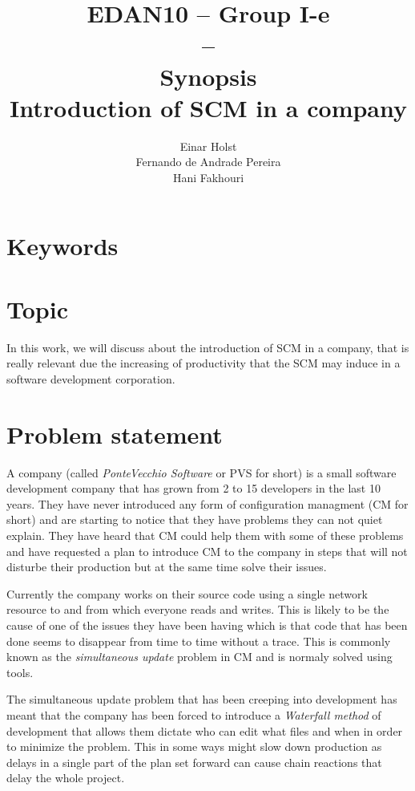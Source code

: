\documentclass[a4paper]{article}
\title{EDAN10 -- Group I-e\\--\\ Synopsis \\
Introduction of SCM in a company 
}
\author{Einar Holst \\
Fernando de Andrade Pereira \\
Hani Fakhouri
}
\begin{document}
\maketitle
\thispagestyle{empty}
\clearpage

\tableofcontents
\thispagestyle{empty}
\clearpage

\setcounter{page}{1}

\section{Keywords}


\section{Topic}
In this work, we will discuss about the introduction of SCM in a company, that is really relevant due the increasing of productivity that the SCM may induce in a  software development corporation.

\section{Problem statement}
A company (called \emph{PonteVecchio Software} or PVS for short) is a small software development company that has grown from 2 to 15 developers in the last 10 years. They have never introduced any form of configuration managment (CM for short) and are starting to notice that they have problems they can not quiet explain. They have heard that CM could help them with some of these problems and have requested a plan to introduce CM to the company in steps that will not disturbe their production but at the same time solve their issues.

Currently the company works on their source code using a single network resource to and from which everyone reads and writes. This is likely to be the cause of one of the issues they have been having which is that code that has been done seems to disappear from time to time without a trace. This is commonly known as the \emph{simultaneous update} problem in CM and is normaly solved using tools.

The simultaneous update problem that has been creeping into development has meant that the company has been forced to introduce a \emph{Waterfall method} of development that allows them dictate who can edit what files and when in order to minimize the problem. This in some ways might slow down production as delays in a single part of the plan set forward can cause chain reactions that delay the whole project.
\end{document}
